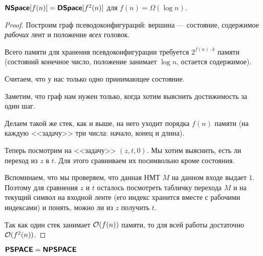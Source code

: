 \begin{thm}
	$ \textmd{\textbf{\textsf{NSpace}}}[f(n)] = \textmd{\textbf{\textsf{DSpace}}}[f^2(n)]$ для $ f(n) = \Omega (\log n)$.
\end{thm}
\begin{proof}
	Построим граф псеводоконфигураций: вершина --- состояние, содержимое \textit{рабочих} лент и положение \textit{всех} головок.

	Всего памяти для хранения псевдоконфигурации требуется  $ 2^{f(n)\cdot k}$ памяти (состояний конечное число, положение занимает $ \log n$, остается содержимое).

	Считаем, что у нас только одно принимающее состояние. 

	Заметим, что граф нам нужен только, когда хотим выяснить достижимость за один шаг.

	Делаем такой же стек, как и выше, на него уходит порядка $ f(n)$ памяти (на каждую <<задачу>> три числа: начало, конец и длина).

	Теперь посмотрим на <<задачу>> $ (z, t, 0)$. Мы хотим выяснить, есть ли переход из $ z$ в $ t$. Для этого сравниваем их посимвольно кроме состояния. 

	Вспоминаем, что мы проверяем, что данная НМТ $ M$ на данном входе выдает $ 1$. Поэтому для сравнения $ z$ и $ t$ осталось посмотреть табличку перехода $ M$ и на текущий символ на входной ленте (его индекс хранится вместе с рабочими индексами) и понять, можно ли из $ z$ получить $ t$.  

	Так как один стек занимает $ \mathcal{O}(f(n))$ памяти, то для всей работы достаточно $ \mathcal{O}(f^2(n))$.
\end{proof}
\begin{cor}
    $ \textmd{\textbf{\textsf{PSPACE}}} = \textmd{\textbf{\textsf{NPSPACE}}}$
\end{cor}

